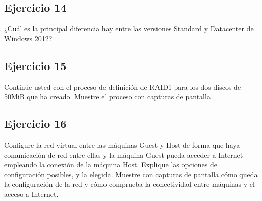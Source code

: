 \documentclass[a4paper, 11pt]{article} %
\begin{document}
\subsection*{Ejercicio 14}
¿Cuál es la principal diferencia hay entre las versiones Standard y
Datacenter de Windows 2012?


\subsection*{Ejercicio 15}
Continúe usted con el proceso de definición de RAID1 para los dos discos
de 50MiB que ha creado. Muestre el proceso con capturas de pantalla


\subsection*{Ejercicio 16}
Configure la red virtual entre las máquinas Guest y Host de forma que
haya comunicación de red entre ellas y la máquina Guest pueda acceder a Internet
empleando la conexión de la máquina Host. Explique las opciones de configuración
posibles, y la elegida. Muestre con capturas de pantalla cómo queda la configuración
de la red y cómo comprueba la conectividad entre máquinas y el acceso a Internet.
\end{document}
